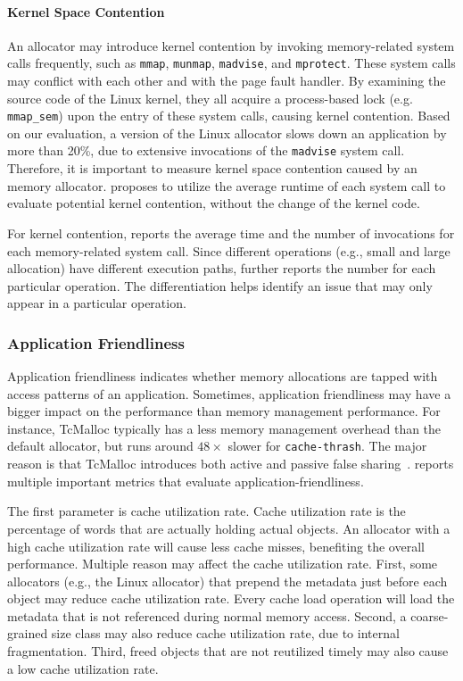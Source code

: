 \paragraph{Kernel Space Contention} 
 An allocator may introduce kernel contention by invoking memory-related system calls frequently, such as \texttt{mmap}, \texttt{munmap}, \texttt{madvise}, and \texttt{mprotect}. These system calls may conflict with each other and with the page fault handler. By examining the source code of the Linux kernel, they all acquire a process-based lock (e.g. \texttt{mmap\_sem}) upon the entry of these system calls, causing kernel contention. Based on our evaluation, a version of the Linux allocator slows down an application by more than 20\%, due to extensive invocations of the \texttt{madvise} system call. Therefore, it is important to measure  kernel space contention caused by an memory allocator. \MP{} proposes to utilize the average runtime of each system call to evaluate potential kernel contention, without the change of the kernel code.

For kernel contention, \MP{} reports the average time and the number of invocations for each memory-related system call. Since different operations (e.g., small and large allocation) have different execution paths, \MP{} further reports the number for each particular operation. The differentiation helps identify an issue that may only appear in a particular operation. 

\subsubsection{Application Friendliness}
\label{sec: friendliness}

Application friendliness indicates whether memory allocations are tapped with access patterns of an application. Sometimes, application friendliness may have a bigger impact on the performance than memory management performance. For instance, TcMalloc typically has a less memory management overhead than the default allocator, but runs around $48\times$ slower  for \texttt{cache-thrash}. The major reason is that TcMalloc introduces both active and passive false sharing~\cite{tcmallocsharing}. \MP{} reports multiple important metrics that evaluate application-friendliness. 


The first parameter is cache utilization rate. Cache utilization rate is the percentage of words that are actually holding actual objects. An allocator with a high cache utilization rate will cause less cache misses, benefiting the overall performance. Multiple reason may affect the cache utilization rate. First, some allocators (e.g., the Linux allocator) that prepend the metadata just before each object may reduce  cache utilization rate. Every cache load operation will load the metadata that is not referenced during normal memory access. 
 Second, a coarse-grained size class may also reduce cache utilization rate, due to internal fragmentation. Third, freed objects that are not reutilized timely may also cause a low cache utilization rate. 

